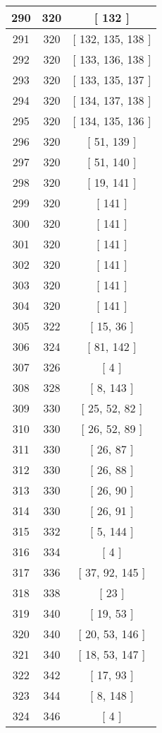 \begin{center}
\begin{longtable}[H]{|| c c c ||}
\hline
290 & 320 & [ 132 ] \\ 
\hline
291 & 320 & [ 132, 135, 138 ] \\ 
\hline
292 & 320 & [ 133, 136, 138 ] \\ 
\hline
293 & 320 & [ 133, 135, 137 ] \\ 
\hline
294 & 320 & [ 134, 137, 138 ] \\ 
\hline
295 & 320 & [ 134, 135, 136 ] \\ 
\hline
296 & 320 & [ 51, 139 ] \\ 
\hline
297 & 320 & [ 51, 140 ] \\ 
\hline
298 & 320 & [ 19, 141 ] \\ 
\hline
299 & 320 & [ 141 ] \\ 
\hline
300 & 320 & [ 141 ] \\ 
\hline
301 & 320 & [ 141 ] \\ 
\hline
302 & 320 & [ 141 ] \\ 
\hline
303 & 320 & [ 141 ] \\ 
\hline
304 & 320 & [ 141 ] \\ 
\hline
305 & 322 & [ 15, 36 ] \\ 
\hline
306 & 324 & [ 81, 142 ] \\ 
\hline
307 & 326 & [ 4 ] \\ 
\hline
308 & 328 & [ 8, 143 ] \\ 
\hline
309 & 330 & [ 25, 52, 82 ] \\ 
\hline
310 & 330 & [ 26, 52, 89 ] \\ 
\hline
311 & 330 & [ 26, 87 ] \\ 
\hline
312 & 330 & [ 26, 88 ] \\ 
\hline
313 & 330 & [ 26, 90 ] \\ 
\hline
314 & 330 & [ 26, 91 ] \\ 
\hline
315 & 332 & [ 5, 144 ] \\ 
\hline
316 & 334 & [ 4 ] \\ 
\hline
317 & 336 & [ 37, 92, 145 ] \\ 
\hline
318 & 338 & [ 23 ] \\ 
\hline
319 & 340 & [ 19, 53 ] \\ 
\hline
320 & 340 & [ 20, 53, 146 ] \\ 
\hline
321 & 340 & [ 18, 53, 147 ] \\ 
\hline
322 & 342 & [ 17, 93 ] \\ 
\hline
323 & 344 & [ 8, 148 ] \\ 
\hline
324 & 346 & [ 4 ] \\ 

\end{longtable}
\end{center}
